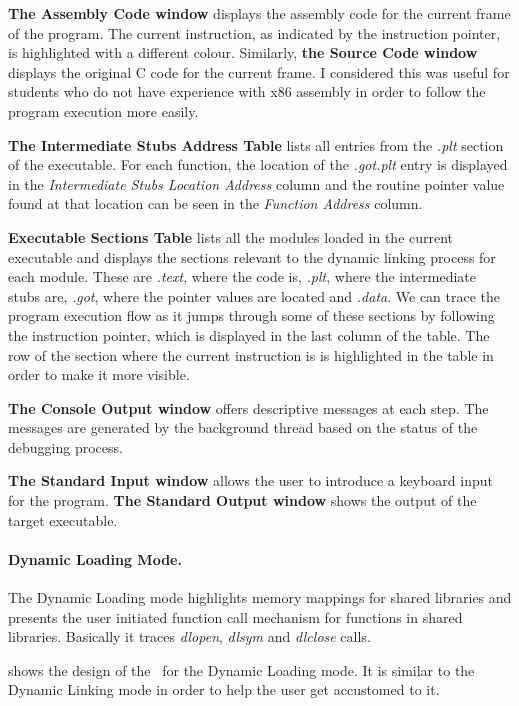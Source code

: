 \textbf{The Assembly Code window} displays the assembly code for the current frame of the program. The current instruction, as indicated by the instruction pointer, is highlighted with a different colour. Similarly, \textbf{the Source Code window} displays the original C code for the current frame. I considered this was useful for students who do not have experience with x86 assembly in order to follow the program execution more easily.

\textbf{The Intermediate Stubs Address Table} lists all entries from the \textit{.plt} section of the executable. For each function, the location of the \textit{.got.plt} entry is displayed in the \textit{Intermediate Stubs Location Address} column and the routine pointer value found at that location can be seen in the \textit{Function Address} column.

\textbf{Executable Sections Table} lists all the modules loaded in the current executable and displays the sections relevant to the dynamic linking process for each module. These are \textit{.text}, where the code is, \textit{.plt}, where the intermediate stubs are, \textit{.got}, where the pointer values are located and \textit{.data}. We can trace the program execution flow as it jumps through some of these sections by following the instruction pointer, which is displayed in the last column of the table. The row of the section where the current instruction is is highlighted in the table in order to make it more visible.
 
\textbf{The Console Output window} offers descriptive messages at each step. The messages are generated by the background thread based on the status of the debugging process.

\textbf{The Standard Input window} allows the user to introduce a keyboard input for the program. \textbf{The Standard Output window} shows the output of the target executable.

\paragraph{Dynamic Loading Mode.}

The Dynamic Loading mode highlights memory mappings for shared libraries and presents the user initiated function call mechanism for functions in shared libraries. Basically it traces \textit{dlopen}, \textit{dlsym} and \textit{dlclose} calls.

 shows the design of the \gui\ for the Dynamic Loading mode. It is similar to the Dynamic Linking mode in order to help the user get accustomed to it.

